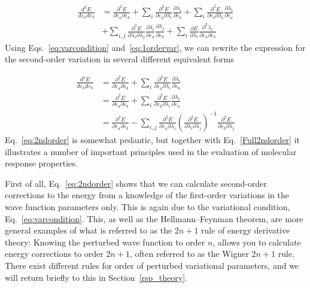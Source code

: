 \documentclass[%
 reprint,
 amsmath,amssymb,
 aps,
]{revtex4-1}
\begin{document}
\begin{align}
  \frac{d^2E}{d\varepsilon_a d\varepsilon_b} &= \frac{\partial^2
    E}{\partial\varepsilon_a\partial\varepsilon_b} +
  \sum_i\frac{\partial^2E}{\partial\varepsilon_a\partial\lambda_i}\frac{\partial\lambda_i}{\partial\varepsilon_b}
  +
  \sum_i\frac{\partial^2E}{\partial\varepsilon_b\partial\lambda_i}\frac{\partial\lambda_i}{\partial\varepsilon_a}\nonumber\\
  &+
  \sum_{i,j}\frac{\partial^2E}{\partial\lambda_i\partial\lambda_j}\frac{\partial\lambda_i}{\partial\varepsilon_a}\frac{\partial\lambda_j}{\partial\varepsilon_b}
  + \sum_i\frac{\partial
    E}{\partial\lambda_i}\frac{\partial^2\lambda_i}{\partial\varepsilon_a\partial\varepsilon_b}\label{eq:Full2ndorder}
\end{align}
Using Eqs.~\eqref{eq:varcondition} and~\eqref{eq:1ordervar}, we can rewrite the
expression for the second-order variation in several different equivalent forms

\begin{align}
\frac{d^2E}{d\varepsilon_a d\varepsilon_b} &= \frac{\partial^2
    E}{\partial\varepsilon_a\partial\varepsilon_b} +
\sum_i\frac{\partial^2E}{\partial\varepsilon_a\partial\lambda_i}\frac{\partial\lambda_i}{\partial\varepsilon_b}\nonumber\\
 &= \frac{\partial^2
  E}{\partial\varepsilon_a\partial\varepsilon_b} +
\sum_i\frac{\partial^2E}{\partial\varepsilon_b\partial\lambda_i}\frac{\partial\lambda_i}{\partial\varepsilon_a}\label{eq:2ndorder}\\
 &= \frac{\partial^2
  E}{\partial\varepsilon_a\partial\varepsilon_b} -
\sum_{i,j}\frac{\partial^2
  E}{\partial\varepsilon_a\partial\lambda_i}\left(\frac{\partial^2
E}{\partial\lambda_i\partial\lambda_j}\right)^{-1}\frac{\partial^2
  E}{\partial\varepsilon_b\partial\lambda_j}\nonumber
\end{align}
Eq.~\eqref{eq:2ndorder} is somewhat pedantic, but together with
Eq.~\eqref{Full2ndorder} it illustrates a number of important principles used
in the evaluation of molecular response properties.

First of all, Eq.~\eqref{eq:2ndorder} shows that we can calculate second-order
corrections to the energy from a knowledge of the first-order variations in the
wave function parameters only. This is again due to the variational condition,
Eq.~\eqref{eq:varcondition}. This, as well as the Hellmann--Feynman theorem,
are more general examples of what is referred to as the $2n+1$ rule of energy
derivative theory: Knowing the perturbed wave function to order $n$, allows you
to calculate energy corrections to order $2n+1$, often referred to as the
Wigner $2n+1$ rule.~\cite{Hylleraas1930,Wigner1930} There exist different rules
for order of perturbed variational parameters, and we will return briefly to
this in Section~\ref{rsp_theory}.
\end{document}
